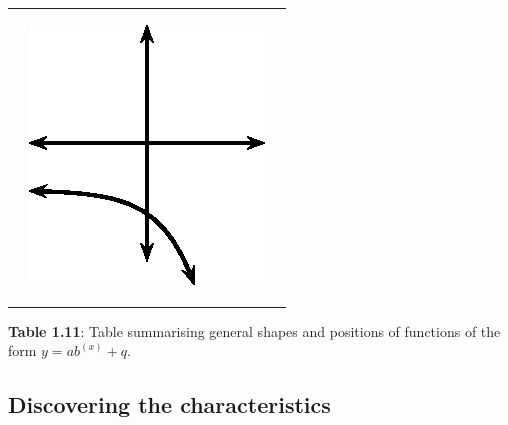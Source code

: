 \begin{center}
\begin{xtabular*}{\mytablewidth}[t]{|p{10\mystarwidth}|p{10\mystarwidth}|p{10\mystarwidth}|}
                 &
    \setcounter{subfigure}{0}
\label{m39348*id250608}
    \begin{center}
    \label{m39348*id250608!!!underscore!!!media}\label{m39348*id250608!!!underscore!!!printimage}\includegraphics[width=.3\columnwidth]{col11306.imgs/m39348_MG10C11_031.png} %
      \vspace{2pt}
    \vspace{.1in}
    \end{center}    
     \tabularnewline{}
    \end{xtabular*}
      \end{center}
    \begin{center}{\small\bfseries Table 1.11}: Table summarising general shapes and positions of functions of the form $y=a{b}^{\left(x\right)}+q$.\end{center}
    \par
  \subsection{Discovering the characteristics}
        \label{m39348*uid187}
